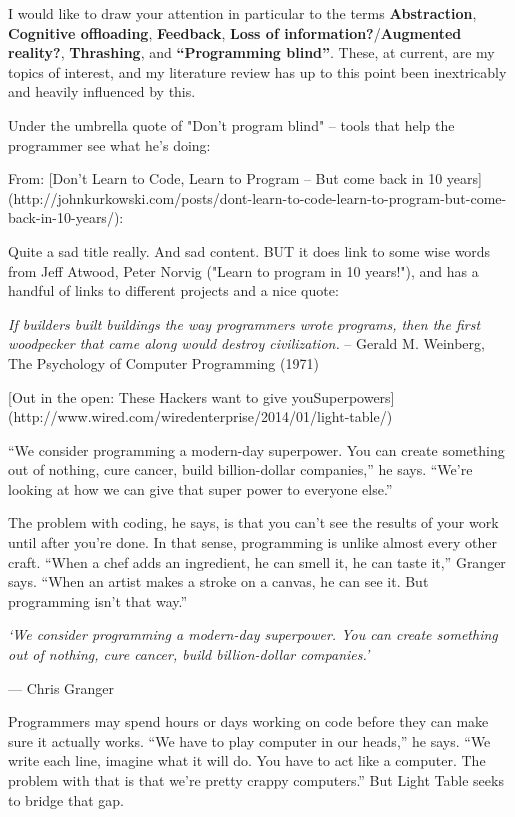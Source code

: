 \documentclass[11pt,openright,a4paper]{report}
\begin{document}
I would like to draw your attention in particular to the terms
\textbf{Abstraction},
\textbf{Cognitive offloading}, \textbf{Feedback}, \textbf{Loss of
information?}/\textbf{Augmented reality?}, \textbf{Thrashing}, and
\textbf{``Programming blind''}. These, at current, are my topics of interest,
and my literature review has up to this point been inextricably and heavily
influenced by this.

Under the umbrella quote of "Don't program blind" -- tools that help the programmer see what he's doing:

From: [Don't Learn to Code, Learn to Program -- But come back in 10 years](http://johnkurkowski.com/posts/dont-learn-to-code-learn-to-program-but-come-back-in-10-years/):

Quite a sad title really. And sad content. BUT it does link to some wise words
from Jeff Atwood, Peter Norvig ("Learn to program in 10 years!"), and has a
handful of links to different projects and a nice quote:

\textit{
    If builders built buildings the way programmers wrote programs, then the
    first woodpecker that came along would destroy civilization.
}
        – Gerald M. Weinberg, The Psychology of Computer Programming (1971)


[Out in the open: These Hackers want to give youSuperpowers](http://www.wired.com/wiredenterprise/2014/01/light-table/)

    “We consider programming a modern-day superpower. You can create something out of nothing, cure cancer, build billion-dollar companies,” he says. “We’re looking at how we can give that super power to everyone else.”
    
    The problem with coding, he says, is that you can’t see the results of your work until after you’re done. In that sense, programming is unlike almost every other craft. “When a chef adds an ingredient, he can smell it, he can taste it,” Granger says. “When an artist makes a stroke on a canvas, he can see it. But programming isn’t that way.”
    
    \textit{‘We consider programming a modern-day superpower. You can create
	    something out of nothing, cure cancer, build billion-dollar
    companies.’}
    
    — Chris Granger
    
    Programmers may spend hours or days working on code before they can make sure it actually works. “We have to play computer in our heads,” he says. “We write each line, imagine what it will do. You have to act like a computer. The problem with that is that we’re pretty crappy computers.” But Light Table seeks to bridge that gap.
    
\end{document}
